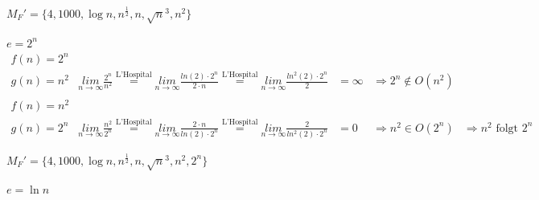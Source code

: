 \documentclass{article}
\begin{document}
\begin{flushright}
	$M_F' = \{4,1000,\operatorname{log}n,n^\frac{1}{2},n,\sqrt{n}^3,n^2\}$
\end{flushright}
\vspace{0.6cm}
$e = 2^n$
\begin{equation*}
	\begin{array}{lllll}
		f(n) = 2^n\\
		g(n) = n^2	&	\underset{n\rightarrow\infty}{lim}	\frac{2^n}{n^2}	\overset{\text{L'Hospital}}{=} \underset{n\rightarrow\infty}{lim} \frac{ln(2)\cdot 2^n}{2 \cdot n} \overset{\text{L'Hospital}}{=} \underset{n\rightarrow\infty}{lim} \frac{ln^2(2)\cdot 2^n}{2} &=	\infty	&\Rightarrow 2^n \not \in O(n^2)
		\\\\
		f(n) = n^2\\
		g(n) = 2^n & \underset{n\rightarrow\infty}{lim} \frac{n^2}{2^n} \overset{\text{L'Hospital}}{=} \underset{n\rightarrow\infty}{lim} \frac{2 \cdot n}{ln(2)\cdot 2^n} \overset{\text{L'Hospital}}{=} \underset{n\rightarrow\infty}{lim} \frac{2}{ln^2(2)\cdot 2^n} &= 0 &\Rightarrow n^2 \in O(2^n) &\Rightarrow  n^2 \text{ folgt } 2^n
	\end{array}
\end{equation*}
\begin{flushright}
	$M_F' = \{4,1000,\operatorname{log}n,n^{\frac{1}{2}},n,\sqrt{n}^3,n^2,2^n\}$
\end{flushright}
\vspace{0.6cm}
$e = \operatorname{ln}n$
\end{document}

